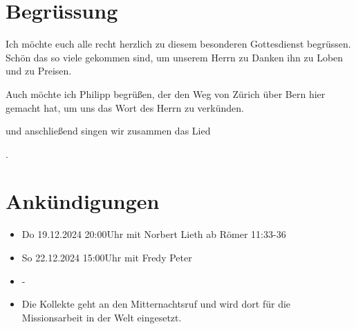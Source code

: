 
\section{Begrüssung}

Ich möchte euch alle recht herzlich zu diesem besonderen Gottesdienst begrüssen. Schön das so viele gekommen sind, um unserem Herrn zu Danken ihn zu Loben und zu Preisen.

Auch möchte ich Philipp begrüßen, der den Weg von Zürich über Bern hier gemacht hat, um uns das Wort des Herrn zu verkünden. 

\noindent
\beten{} und anschließend singen wir zusammen das Lied

\noindent
{}.

\section{Ankündigungen}
\begin{itemize}
    \item {} Do 19.12.2024 20:00Uhr mit Norbert Lieth ab Römer 11:33-36
    \item {} So 22.12.2024 15:00Uhr mit Fredy Peter
    \item {} -
    \item {} Die Kollekte geht an den Mitternachtsruf und wird dort für die Missionsarbeit in der Welt eingesetzt.
\end{itemize}

